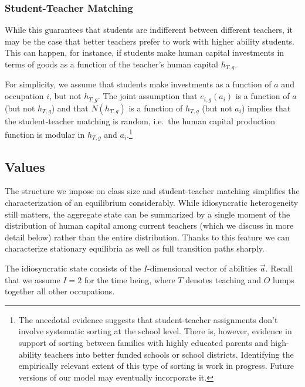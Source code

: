 \documentclass[onehalfspacing,11pt]{article}
\begin{document}
	\subsubsection{Student-Teacher Matching}
	While this guarantees that students are indifferent between different teachers, it may be the case that better teachers prefer to work with higher ability students. This can happen, for instance, if students make human capital investments in terms of goods as a function of the teacher's human capital $h_{T,g}$. 
	
	For simplicity, we assume that students make investments as a function of $a$ and occupation $i$, but not $h_{T,g}$. The joint assumption that $e_{i,g}(a_i)$ is a function of $a$ (but not $h_{T,g}$) and that $N(h_{T,g})$ is a function of $h_{T,g}$ (but not $a_i$) implies that the student-teacher matching is random, i.e.~the human capital production function is modular in $h_{T,g}$ and $a_i$.\footnote{The anecdotal evidence suggests that student-teacher assignments don't involve systematic sorting at the school level. There is, however, evidence in support of sorting between families with highly educated parents and high-ability teachers into better funded schools or school districts. Identifying the empirically relevant extent of this type of sorting is work in progress. Future versions of our model may eventually incorporate it.}
	
	\subsection{Values}
	The structure we impose on class size and student-teacher matching simplifies the characterization of an equilibrium considerably. While idiosyncratic heterogeneity still matters, the aggregate state can be summarized by a single moment of the distribution of human capital among current teachers (which we discuss in more detail below) rather than the entire distribution. Thanks to this feature we can characterize stationary equilibria as well as full transition paths sharply.
	
	The idiosyncratic state consists of the $I$-dimensional vector of abilities $\vec{a}$. Recall that we assume $I=2$ for the time being, where $T$ denotes teaching and $O$ lumps together all other occupations.
	
\end{document}
